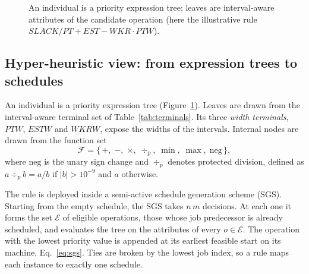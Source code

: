 \documentclass[review,authoryear,11pt]{elsarticle}
\begin{document}
\begin{figure}[!t]
\centering
{}
\caption{An individual is a priority expression tree; leaves are
interval-aware attributes of the candidate operation (here the
illustrative rule $\mathit{SLACK}/\mathit{PT} + \mathit{EST} -
\mathit{WKR}\cdot\mathit{PTW}$).}
\label{fig:tree}
\end{figure}

\subsection{Hyper-heuristic view: from expression trees to schedules}
\label{sec:hhview}
An individual is a priority expression tree (Figure~\ref{fig:tree}).
Leaves are drawn from the interval-aware terminal set of
Table~\ref{tab:terminals}. Its three \emph{width terminals},
$\mathit{PTW}$, $\mathit{ESTW}$ and $\mathit{WKRW}$, expose the widths of
the intervals. Internal nodes are drawn from the function set
\begin{equation}
\mathcal{F} = \{\, +,\; -,\; \times,\; \div_p,\; \min,\; \max,\;
\mathrm{neg} \,\},
\end{equation}
where $\mathrm{neg}$ is the unary sign change and $\div_p$ denotes
protected division, defined as $a \div_p b = a/b$ if $|b| > 10^{-9}$ and
$a$ otherwise.

The rule is deployed inside a semi-active schedule generation scheme
(SGS). Starting from the empty schedule, the SGS takes $n\,m$ decisions.
At each one it forms the set $\mathcal{E}$ of eligible operations, those
whose job predecessor is already scheduled, and evaluates the tree on
the attributes of every $o \in \mathcal{E}$. The operation with the
lowest priority value is appended at its earliest feasible start on its
machine, Eq.~\eqref{eq:sgs}. Ties are broken by the lowest job index, so
a rule maps each instance to exactly one schedule.
\end{document}
